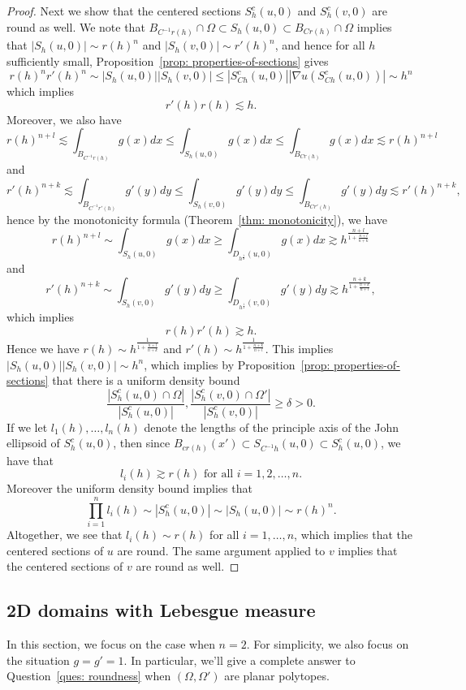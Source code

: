 \documentclass[12pt,reqno]{amsart}
\numberwithin{equation}{section}
\begin{document}
\begin{proof}
            Next we show that the centered sections $S_h^c(u, 0)$ and $S_h^c(v, 0)$ are round as well. We note that $B_{C^{-1}r(h)}\cap\Omega\subset S_h(u, 0)\subset B_{Cr(h)}\cap\Omega$ implies that $|S_h(u, 0)|\sim r(h)^n$ and $|S_h(v, 0)|\sim r'(h)^n$, and hence for all $h$ sufficiently small, Proposition~\ref{prop: properties-of-sections} gives
            \[r(h)^nr'(h)^n\sim |S_h(u, 0)||S_h(v, 0)|\leq |S_{Ch}^c(u, 0)||\nabla u(S_{Ch}^c(u, 0))|\sim h^n\]
            which implies
            \[r'(h)r(h)\lesssim h. \]
            Moreover, we also have
            \[ r(h)^{n+l}\lesssim \int_{B_{C^{-1}r(h)}}g(x)dx\leq \int_{S_h(u, 0)}g(x)dx\leq \int_{B_{Cr(h)}}g(x)dx\lesssim r(h)^{n+l}\]
            and 
            \[r'(h)^{n+k}\lesssim \int_{B_{C^{-1}r'(h)}}g'(y)dy\leq \int_{S_h(v, 0)}g'(y)dy\leq \int_{B_{Cr'(h)}}g'(y)dy\lesssim r'(h)^{n+k}, \]
            hence by the monotonicity formula (Theorem~\ref{thm: monotonicity}), we have
            \[r(h)^{n+l}\sim \int_{S_h(u, 0)}g(x)dx\geq \int_{D_{h^{\frac 1 2}}(u, 0)}g(x)dx\gtrsim h^{\frac{n+l}{1+\frac{n+l}{n+k}}}\]
            and
            \[r'(h)^{n+k}\sim \int_{S_h(v, 0)}g'(y)dy\geq \int_{D_{h^{\frac 1 2}}(v, 0)}g'(y)dy\gtrsim h^{\frac{n+k}{1+\frac{n+k}{n+l}}}, \]
            which implies
            \[r(h)r'(h)\gtrsim h. \]
            Hence we have $r(h)\sim h^{\frac{1}{1+\frac{n+l}{n+k}}}$ and $r'(h)\sim  h^{\frac{1}{1+\frac{n+k}{n+l}}}$. This implies $|S_h(u, 0)||S_h(v, 0)|\sim h^n$, which implies by Proposition~\ref{prop: properties-of-sections} that there is a uniform density bound
            \[\frac{|S_h^c(u, 0)\cap\Omega|}{|S_h^c(u, 0)|}, \frac{|S_h^c(v, 0)\cap\Omega'|}{|S_h^c(v, 0)|}\geq \delta >0. \]
            If we let $l_1(h), \ldots, l_n(h)$ denote the lengths of the principle axis of the John ellipsoid of $S_h^c(u, 0)$, then since $B_{cr(h)}(x')\subset S_{C^{-1}h}(u, 0)\subset S_{h}^c(u, 0)$, we have that
            \[l_i(h)\gtrsim r(h) \text{ for all }i = 1, 2, \ldots, n.\]
            Moreover the uniform density bound implies that 
            \[\prod_{i=1}^nl_i(h)\sim |S_h^c(u, 0)|\sim |S_h(u, 0)|\sim r(h)^n.\]
            Altogether, we see that $l_i(h)\sim r(h)$ for all $i = 1, \ldots, n$, which implies that the centered sections of $u$ are round. The same argument applied to $v$ implies that the centered sections of $v$ are round as well. 
        \end{proof}

        \subsection{2D domains with Lebesgue measure}
        In this section, we focus on the case when $n=2$. For simplicity, we also focus on the situation $g = g' =1$. In particular, we'll give a complete answer to Question~\ref{ques: roundness} when $(\Omega, \Omega')$ are planar polytopes. 
        
\end{document}
